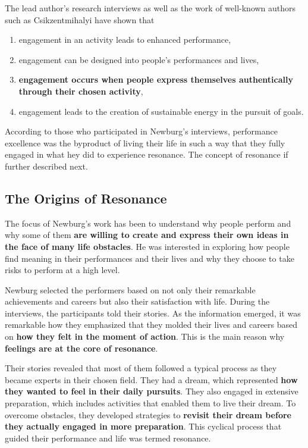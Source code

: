 \documentclass[ebook,12pt,oneside,openany]{memoir}
\begin{document}
The lead author's research interviews as well as the work of well-known authors such as Csikzentmihalyi have shown that 
\begin{enumerate}
    \item engagement in an activity leads to enhanced performance,
    \item engagement can be designed into people's performances and lives,
    \item \textbf{engagement occurs when people express themselves authentically through their chosen activity},
    \item engagement leads to the creation of sustainable energy in the pursuit of goals.
\end{enumerate}
According to those who participated in Newburg's interviews, performance excellence was the byproduct of living their life in such a way that they 
fully engaged in what hey did to experience resonance. The concept of resonance if further described next.

\subsection{The Origins of Resonance}
The focus of Newburg's work has been to understand why people perform and why some of them
\textbf{are willing to create and express their own ideas in the face of many life obstacles}.
He was interested in exploring how people find meaning in their performances and their lives and why they choose to take risks to perform at a high level.

Newburg selected the performers based on not only their remarkable achievements and careers but also their satisfaction with life.
During the interviews, the participants told their stories. As the information emerged, it was remarkable how they emphasized that they molded their lives and careers based on
\textbf{how they felt in the moment of action}. 
This is the main reason why \textbf{feelings are at the core of resonance}.

Their stories revealed that most of them followed a typical process as they became experts in their chosen field. 
They had a dream, which represented \textbf{how they wanted to feel in their daily pursuits}.
They also engaged in extensive preparation, which includes activities that enabled them to live their dream.
To overcome obstacles, they developed strategies to \textbf{revisit their dream before they actually engaged in more preparation}.
This cyclical process that guided their performance and life was termed resonance.
\end{document}
